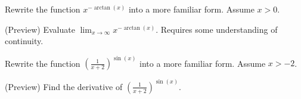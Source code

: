 \documentclass[../main.tex]{subfiles}
\begin{document}
  \begin{example}
    Rewrite the function \(x^{-\arctan(x)}\) into a more familiar form. Assume \(x > 0\). 

    (Preview) Evaluate \(\lim_{x \to \infty} x^{-\arctan(x)}\). Requires some understanding of continuity.
  \end{example}

  \begin{example}
    Rewrite the function \(\left(\frac{1}{x+2}\right)^{\sin(x)}\) into a more familiar form. Assume \(x > -2\). 

    (Preview) Find the derivative of \(\left(\frac{1}{x+2}\right)^{\sin(x)}\). 
  \end{example}
\end{document}
